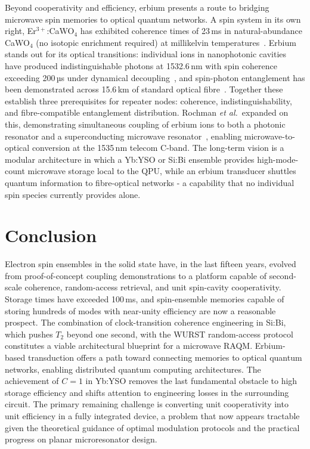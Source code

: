 \documentclass[technote]{IEEEtran}
\begin{document}
Beyond cooperativity and efficiency, erbium presents a route to bridging microwave spin memories to optical quantum networks. A spin system in its own right, Er$^{3+}$:CaWO$_4$ has exhibited coherence times of 23\,ms in natural-abundance CaWO$_4$ (no isotopic enrichment required) at millikelvin temperatures~\cite{dantec2021}. Erbium stands out for its optical transitions: individual ions in nanophotonic cavities have produced indistinguishable photons at 1532.6\,nm with spin coherence exceeding 200\,µs under dynamical decoupling~\cite{ourari2023}, and spin-photon entanglement has been demonstrated across 15.6\,km of standard optical fibre~\cite{uysal2024}. Together these establish three prerequisites for repeater nodes: coherence, indistinguishability, and fibre-compatible entanglement distribution. Rochman \textit{et al.}\ expanded on this, demonstrating simultaneous coupling of erbium ions to both a photonic resonator and a superconducting microwave resonator~\cite{rochman2023}, enabling microwave-to-optical conversion at the 1535\,nm telecom C-band. The long-term vision is a modular architecture in which a Yb:YSO or Si:Bi ensemble provides high-mode-count microwave storage local to the QPU, while an erbium transducer shuttles quantum information to fibre-optical networks - a capability that no individual spin species currently provides alone.


\section{Conclusion}

Electron spin ensembles in the solid state have, in the last fifteen years, evolved from proof-of-concept coupling demonstrations to a platform capable of second-scale coherence, random-access retrieval, and unit spin-cavity cooperativity. Storage times have exceeded 100\,ms, and spin-ensemble memories capable of storing hundreds of modes with near-unity efficiency are now a reasonable prospect. The combination of clock-transition coherence engineering in Si:Bi, which pushes $T_2$ beyond one second, with the WURST random-access protocol constitutes a viable architectural blueprint for a microwave RAQM. Erbium-based transduction offers a path toward connecting memories to optical quantum networks, enabling distributed quantum computing architectures. The achievement of $C = 1$ in Yb:YSO removes the last fundamental obstacle to high storage efficiency and shifts attention to engineering losses in the surrounding circuit. The primary remaining challenge is converting unit cooperativity into unit efficiency in a fully integrated device, a problem that now appears tractable given the theoretical guidance of optimal modulation protocols and the practical progress on planar microresonator design.




\end{document}
